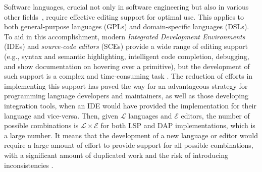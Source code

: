 Software languages, crucial not only in software engineering but also in various other fields~\cite{Paulin93, Colmerauer90}, require effective editing support for optimal use.
This applies to both general-purpose languages (GPLs) and domain-specific languages (DSLs).
To aid in this accomplishment, modern \textit{Integrated Development Environments} (IDEs) and \textit{source-code editors} (SCEs) provide a wide range of editing support (e.g., syntax and semantic highlighting, intelligent code completion, debugging, and show documentation on hovering over a primitive), but the development of such support is a complex and time-consuming task \cite{Rodriguez-Echeverria18}.
The reduction of efforts in implementing this support has paved the way for an advantageous strategy for programming language developers and maintainers, as well as those developing integration tools, when an IDE would have provided the implementation for their language and vice-versa.
Then, given $\mathcal{L}$ languages and $\mathcal{E}$ editors, the number of possible combinations is $\mathcal{L} \times \mathcal{E}$ for both LSP and DAP implementations, which is a large number.
It means that the development of a new language or editor would require a large amount of effort to provide support for all possible combinations, with a significant amount of duplicated work and the risk of introducing inconsistencies \cite{Rask21}.

